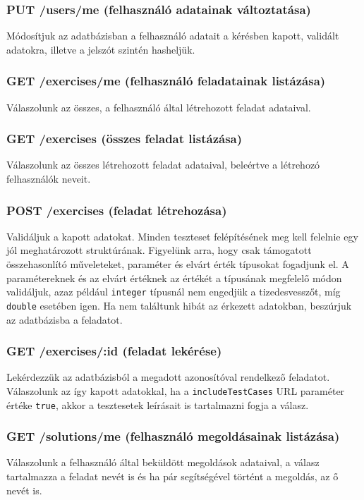 \documentclass{elteikthesis}
\begin{document}
				\subsubsection{PUT /users/me (felhasználó adatainak változtatása)}
					Módosítjuk az adatbázisban a felhasználó adatait a kérésben kapott, validált adatokra, illetve a jelszót szintén hasheljük.
				
				\subsubsection{GET /exercises/me (felhasználó feladatainak listázása)}
					Válaszolunk az összes, a felhasználó által létrehozott feladat adataival.
				
				\subsubsection{GET /exercises (összes feladat listázása)}
					Válaszolunk az összes létrehozott feladat adataival, beleértve a létrehozó felhasználók neveit.
				
				\subsubsection{POST /exercises (feladat létrehozása)}
					Validáljuk a kapott adatokat. Minden teszteset felépítésének meg kell felelnie egy jól meghatározott struktúrának. Figyelünk arra, hogy csak támogatott összehasonlító műveleteket, paraméter és elvárt érték típusokat fogadjunk el. A paramétereknek és az elvárt értéknek az értékét a típusának megfelelő módon validáljuk, azaz például \texttt{integer} típusnál nem engedjük a tizedesvesszőt, míg \texttt{double} esetében igen. Ha nem találtunk hibát az érkezett adatokban, beszúrjuk az adatbázisba a feladatot.
				
				\subsubsection{GET /exercises/:id (feladat lekérése)}
					Lekérdezzük az adatbázisból a megadott azonosítóval rendelkező feladatot. Válaszolunk az így kapott adatokkal, ha a \texttt{includeTestCases} URL paraméter értéke \texttt{true}, akkor a tesztesetek leírásait is tartalmazni fogja a válasz.
				
				\subsubsection{GET /solutions/me (felhasználó megoldásainak listázása)}
					Válaszolunk a felhasználó által beküldött megoldások adataival, a válasz tartalmazza a feladat nevét is és ha pár segítségével történt a megoldás, az ő nevét is.
				
\end{document}
